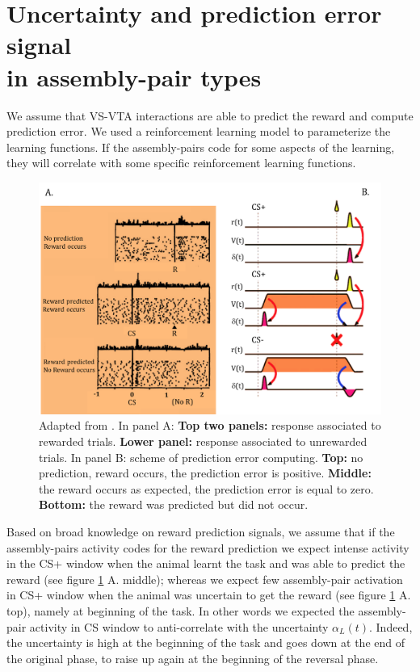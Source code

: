 \section{Uncertainty and prediction error signal\\in assembly-pair types}
\label{sec:CorrRL}
We assume that VS-VTA interactions are able to predict the reward and compute prediction error. We used a reinforcement learning model to parameterize the learning functions. If the assembly-pairs code for some aspects of the learning, they will correlate with some specific reinforcement learning functions.\\
\begin{figure}
    \centering
    \includegraphics[scale=0.35]{figures/RewardDoyaRLSUM.png}
    \caption{Adapted from \cite{Doya}. In panel A: \textbf{Top two panels:} response associated to rewarded trials. \textbf{Lower panel:} response associated to unrewarded trials. In panel B: scheme of prediction error computing. \textbf{Top:} no prediction, reward occurs, the prediction error is positive. \textbf{Middle:} the reward occurs as expected, the prediction error is equal to zero. \textbf{Bottom:} the reward was predicted but did not occur.}
    \label{fig:RewDoyaSum}
\end{figure}%
Based on broad knowledge on reward prediction signals, we assume that if the assembly-pairs activity codes for the reward prediction we expect intense activity in the CS+ window when the animal learnt the task and was able to predict the reward (see figure \ref{fig:RewDoyaSum} A. middle); whereas we expect few assembly-pair activation in CS+ window when the animal was uncertain to get the reward (see figure \ref{fig:RewDoyaSum} A. top), namely at beginning of the task. In other words we expected the assembly-pair activity in CS window to anti-correlate with the uncertainty $\alpha_L(t)$. Indeed, the uncertainty is high at the beginning of the task and goes down at the end of the original phase, to raise up again at the beginning of the reversal phase. 
